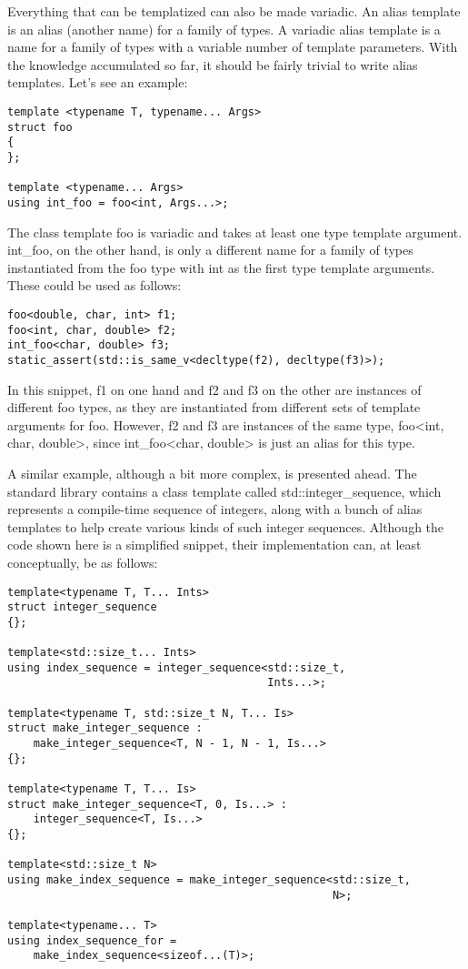Everything that can be templatized can also be made variadic. An alias template is an alias (another name) for a family of types. A variadic alias template is a name for a family of types with a variable number of template parameters. With the knowledge accumulated so far, it should be fairly trivial to write alias templates. Let's see an example:

\begin{lstlisting}[style=styleCXX]
template <typename T, typename... Args>
struct foo
{
};

template <typename... Args>
using int_foo = foo<int, Args...>;
\end{lstlisting}

The class template foo is variadic and takes at least one type template argument. int\_foo, on the other hand, is only a different name for a family of types instantiated from the foo type with int as the first type template arguments. These could be used as follows:

\begin{lstlisting}[style=styleCXX]
foo<double, char, int> f1;
foo<int, char, double> f2;
int_foo<char, double> f3;
static_assert(std::is_same_v<decltype(f2), decltype(f3)>);
\end{lstlisting}

In this snippet, f1 on one hand and f2 and f3 on the other are instances of different foo types, as they are instantiated from different sets of template arguments for foo. However, f2 and f3 are instances of the same type, foo<int, char, double>, since int\_foo<char, double> is just an alias for this type.

A similar example, although a bit more complex, is presented ahead. The standard library contains a class template called std::integer\_sequence, which represents a compile-time sequence of integers, along with a bunch of alias templates to help create various kinds of such integer sequences. Although the code shown here is a simplified snippet, their implementation can, at least conceptually, be as follows:

\begin{lstlisting}[style=styleCXX]
template<typename T, T... Ints>
struct integer_sequence
{};

template<std::size_t... Ints>
using index_sequence = integer_sequence<std::size_t,
								        Ints...>;

template<typename T, std::size_t N, T... Is>
struct make_integer_sequence :
	make_integer_sequence<T, N - 1, N - 1, Is...>
{};

template<typename T, T... Is>
struct make_integer_sequence<T, 0, Is...> :
	integer_sequence<T, Is...>
{};

template<std::size_t N>
using make_index_sequence = make_integer_sequence<std::size_t,
												  N>;

template<typename... T>
using index_sequence_for =
	make_index_sequence<sizeof...(T)>;
\end{lstlisting}

